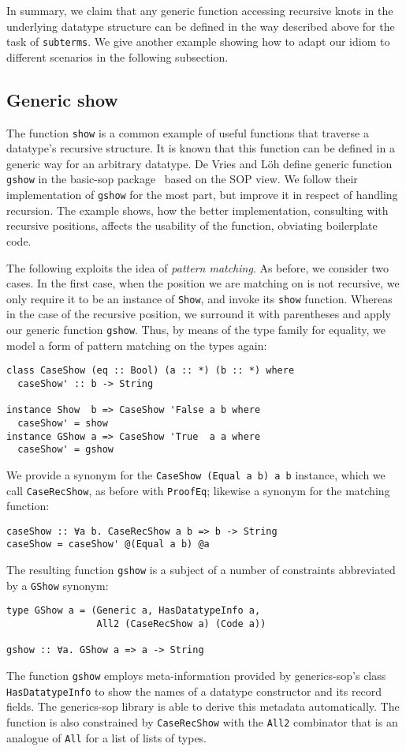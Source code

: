 \documentclass[runningheads]{llncs}
\newcommand{\K}[1]{\lstinline{#1}}
\begin{document}
In summary, we claim that any generic function accessing recursive knots in the underlying datatype structure can be defined in the way described above for the task of \K{subterms}. We give another example showing how to adapt our idiom to different scenarios in the following subsection.

\subsection{Generic show}
\label{subsec:gshow}

The function \K{show} is a common example of useful functions that traverse a datatype's recursive structure. It is known that this function can be defined in a generic way for an arbitrary datatype. De Vries and L\"{o}h define generic function \K{gshow} in the \textsf{basic-sop} package~\cite{basic-sop} based on the SOP view. We follow their implementation of \K{gshow} for the most part, but improve it in respect of handling recursion. The example shows, how the better implementation, consulting with recursive positions, affects the usability of the function, obviating boilerplate code.

The following exploits the idea of \emph{pattern matching}. As before, we consider two cases. In the first case, when the position we are matching on is not recursive, we only require it to be an  instance of \K{Show}, and invoke its \K{show} function. Whereas in the case of the recursive position, we surround it with parentheses and apply our generic function \K{gshow}. Thus, by means of the type family for equality, we model a form of pattern matching on the types again:
\begin{lstlisting}
class CaseShow (eq :: Bool) (a :: *) (b :: *) where
  caseShow' :: b -> String

instance Show  b => CaseShow 'False a b where
  caseShow' = show
instance GShow a => CaseShow 'True  a a where
  caseShow' = gshow
\end{lstlisting}
We provide a synonym for the \K{CaseShow (Equal a b) a b} instance, which we call \K{CaseRecShow}, as before with \K{ProofEq}; likewise a synonym for the matching function:
\begin{lstlisting}
caseShow :: ∀a b. CaseRecShow a b => b -> String
caseShow = caseShow' @(Equal a b) @a
\end{lstlisting}

The resulting function \K{gshow} is a subject of a number of constraints abbreviated by a \K{GShow} synonym:
\begin{lstlisting}
type GShow a = (Generic a, HasDatatypeInfo a,
                All2 (CaseRecShow a) (Code a))

gshow :: ∀a. GShow a => a -> String
\end{lstlisting}
The function \K{gshow} employs meta-information provided by \textsf{generics-sop}'s class \K{HasDatatypeInfo} to show the names of a datatype constructor and its record fields. The \textsf{generics-sop} library is able to derive this metadata automatically.
The function is also constrained by \K{CaseRecShow} with the \K{All2} combinator that is an analogue of \K{All} for a list of lists of types. 
\end{document}
